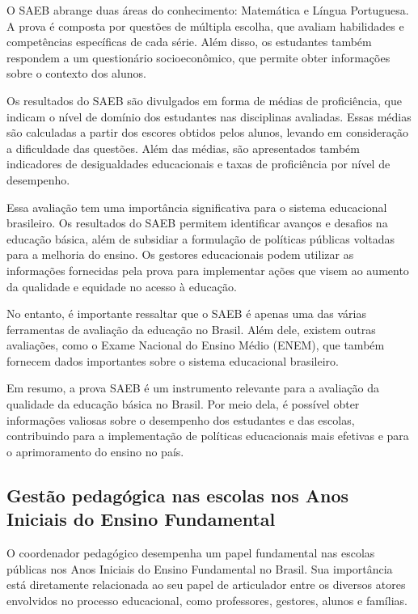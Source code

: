 O SAEB abrange duas áreas do conhecimento: Matemática e Língua
Portuguesa. A prova é composta por questões de múltipla escolha, que
avaliam habilidades e competências específicas de cada série. Além
disso, os estudantes também respondem a um questionário socioeconômico,
que permite obter informações sobre o contexto dos alunos.

Os resultados do SAEB são divulgados em forma de médias de proficiência,
que indicam o nível de domínio dos estudantes nas disciplinas avaliadas.
Essas médias são calculadas a partir dos escores obtidos pelos alunos,
levando em consideração a dificuldade das questões. Além das médias, são
apresentados também indicadores de desigualdades educacionais e taxas de
proficiência por nível de desempenho.

Essa avaliação tem uma importância significativa para o sistema
educacional brasileiro. Os resultados do SAEB permitem identificar
avanços e desafios na educação básica, além de subsidiar a formulação de
políticas públicas voltadas para a melhoria do ensino. Os gestores
educacionais podem utilizar as informações fornecidas pela prova para
implementar ações que visem ao aumento da qualidade e equidade no acesso
à educação.

No entanto, é importante ressaltar que o SAEB é apenas uma das várias
ferramentas de avaliação da educação no Brasil. Além dele, existem
outras avaliações, como o Exame Nacional do Ensino Médio (ENEM), que
também fornecem dados importantes sobre o sistema educacional
brasileiro.

Em resumo, a prova SAEB é um instrumento relevante para a avaliação da
qualidade da educação básica no Brasil. Por meio dela, é possível obter
informações valiosas sobre o desempenho dos estudantes e das escolas,
contribuindo para a implementação de políticas educacionais mais
efetivas e para o aprimoramento do ensino no país.

\subsection{Gestão pedagógica nas escolas nos Anos Iniciais do Ensino
Fundamental}\label{gestuxe3o-pedaguxf3gica-nas-escolas-nos-anos-iniciais-do-ensino-fundamental}

O coordenador pedagógico desempenha um papel fundamental nas escolas
públicas nos Anos Iniciais do Ensino Fundamental no Brasil. Sua
importância está diretamente relacionada ao seu papel de articulador
entre os diversos atores envolvidos no processo educacional, como
professores, gestores, alunos e famílias.


